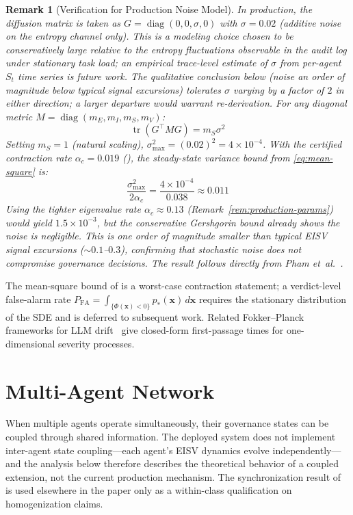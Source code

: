 \documentclass[11pt,twocolumn]{article}
\newtheorem{remark}[theorem]{Remark}
\newcommand{\eisv}{\ensuremath{\mathbf{x}}}
\begin{document}
\begin{remark}[Verification for Production Noise Model]
In production, the diffusion matrix is taken as
$G = \operatorname{diag}(0, 0, \sigma, 0)$ with $\sigma = 0.02$
(additive noise on the entropy channel only). This is a modeling
choice chosen to be conservatively large relative to the entropy
fluctuations observable in the audit log under stationary task load;
an empirical trace-level estimate of $\sigma$ from per-agent $S_t$
time series is future work. The qualitative conclusion below (noise
an order of magnitude below typical signal excursions) tolerates
$\sigma$ varying by a factor of $2$ in either direction; a larger
departure would warrant re-derivation. For any diagonal metric
$M = \operatorname{diag}(m_E, m_I, m_S, m_V)$:
\[
  \operatorname{tr}(G^\top M G) = m_S \sigma^2
\]
Setting $m_S = 1$ (natural scaling), $\sigma_{\max}^2 = (0.02)^2 =
4 \times 10^{-4}$. With the certified contraction rate
$\alpha_c = 0.019$ (), the steady-state
variance bound from \eqref{eq:mean-square} is:
\[
  \frac{\sigma_{\max}^2}{2\alpha_c} = \frac{4 \times 10^{-4}}{0.038}
  \approx 0.011
\]
Using the tighter eigenvalue rate $\alpha_c \approx 0.13$
(Remark~\ref{rem:production-params}) would yield $1.5 \times 10^{-3}$,
but the conservative Gershgorin bound already shows the noise is
negligible. This is one order of magnitude smaller than typical EISV signal
excursions ($\sim 0.1$--$0.3$), confirming that stochastic noise does
not compromise governance decisions. The result follows directly from
Pham et~al.~\cite{pham2009stochastic}.
\end{remark}

The mean-square bound of  is a worst-case
contraction statement; a verdict-level false-alarm rate
$P_{\text{FA}} = \int_{\{\Phi(\eisv) < 0\}} p_\ast(\eisv)\, d\eisv$
requires the stationary distribution of the SDE and is deferred
to subsequent work. Related Fokker--Planck frameworks for LLM
drift~\cite{carson2025stochastic} give closed-form first-passage
times for one-dimensional severity processes.


\section{Multi-Agent Network}
\label{sec:network}

When multiple agents operate simultaneously, their governance
states can be coupled through shared information. The deployed
system does not implement inter-agent state coupling---each agent's
EISV dynamics evolve independently---and the analysis below
therefore describes the theoretical behavior of a coupled
extension, not the current production mechanism. The synchronization
result of  is used elsewhere in the paper only as
a within-class qualification on homogenization claims.
\end{document}
